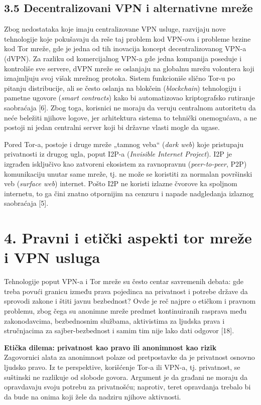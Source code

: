 \documentclass[
]{article}
\begin{document}
\subsection{3.5 Decentralizovani VPN i alternativne mreže}
\label{sec:t3.5}

Zbog nedostataka koje imaju centralizovane VPN usluge, razvijaju nove
tehnologije koje pokušavaju da reše taj problem kod VPN-ova i probleme
brzine kod Tor mreže, gde je jedna od tih inovacija koncept
decentralizovanog VPN-a (dVPN). Za razliku od komercijalnog VPN-a gde
jedna kompanija poseduje i kontroliše sve servere, dVPN mreže se
oslanjaju na globalnu mrežu volontera koji iznajmljuju svoj višak
mrežnog protoka. Sistem funkcioniše slično Tor-u po pitanju
distribucije, ali se često oslanja na blokčein (\emph{blockchain}) tehnologiju i pametne
ugovore (\emph{smart contracts}) kako bi automatizovao kriptografsko rutiranje
saobraćaja [6]. Zbog toga, korisnici ne moraju da veruju centralnom
autoritetu da neće beležiti njihove logove, jer arhitektura sistema to
tehnički onemogućava, a ne postoji ni jedan centralni server koji bi
državne vlasti mogle da ugase.

Pored Tor-a, postoje i druge mreže „tamnog veba`` (\emph{dark web}) koje pristupaju
privatnosti iz drugog ugla, poput I2P-a (\emph{Invisible Internet
Project}). I2P je izgrađen isključivo kao zatvoreni ekosistem za
ravnopravnu (\emph{peer-to-peer}, P2P) komunikaciju unutar same mreže, tj. ne može se
koristiti za normalan površinski veb (\emph{surface web}) internet. Pošto I2P ne koristi
izlazne čvorove ka spoljnom internetu, to ga čini znatno otpornijim na
cenzuru i napade nadgledanja izlaznog saobraćaja [5].

\section{4. Pravni i etički aspekti tor mreže i VPN usluga}
\label{sec:t4}

Tehnologije poput VPN-a i Tor mreže su često centar savremenih debata:
gde treba povući granicu između prava pojedinca na privatnost i potrebe
države da sprovodi zakone i štiti javnu bezbednost? Ovde je reč najpre o
etičkom i pravnom problemu, zbog čega su anonimne mreže predmet
kontinuiranih rasprava među zakonodavcima, bezbednosnim službama,
aktivistima za ljudska prava i stručnjacima za sajber-bezbednost i samim
tim nije lako dati odgovor [18].

\textbf{Etička dilema: privatnost kao pravo ili anonimnost kao rizik}\\
Zagovornici alata za anonimnost polaze od pretpostavke da je privatnost
osnovno ljudsko pravo. Iz te perspektive, korišćenje Tor-a ili VPN-a,
tj. privatnost, se suštinski ne razlikuje od slobode govora. Argument je
da građani ne moraju da opravdavaju svoju potrebu za privatnošću;
naprotiv, teret opravdanja trebalo bi da bude na onima koji žele da
nadziru njihove aktivnosti.
\end{document}
